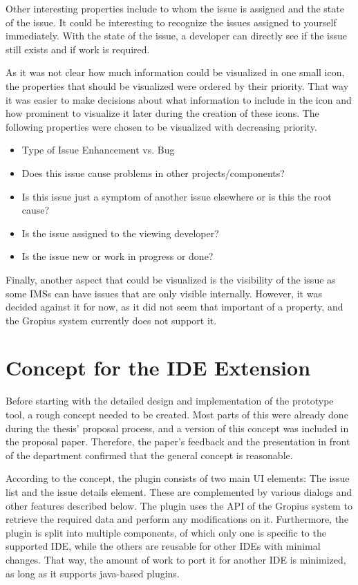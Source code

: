 Other interesting properties include to whom the issue is assigned and the state of the issue.
It could be interesting to recognize the issues assigned to yourself immediately.
With the state of the issue, a developer can directly see if the issue still exists and if work is required.

As it was not clear how much information could be visualized in one small icon, 
the properties that should be visualized were ordered by their priority.
That way it was easier to make decisions about what information to include in the icon and how prominent to visualize it later during the creation of these icons.
The following properties were chosen to be visualized with decreasing priority.
\begin{itemize}
	\item Type of Issue
	\subitem Enhancement vs. Bug
	\item Does this issue cause problems in other projects/components?
	\item Is this issue just a symptom of another issue elsewhere or is this the root cause?
	\item Is the issue assigned to the viewing developer?
	\item Is the issue new or work in progress or done?
\end{itemize}
Finally, another aspect that could be visualized is the visibility of the issue as some \glspl{IMS} can have issues that are only visible internally.
However, it was decided against it for now, as it did not seem that important of a property, and the Gropius system currently does not support it.

\section{Concept for the \gls{IDE} Extension}
\label{sec:ch3:s3}
Before starting with the detailed design and implementation of the prototype tool, a rough concept needed to be created.
Most parts of this were already done during the thesis' proposal process, and a version of this concept was included in the proposal paper.
Therefore, the paper's feedback and the presentation in front of the department confirmed that the general concept is reasonable.

According to the concept, the plugin consists of two main \gls{UI} elements: The issue list and the issue details element.
These are complemented by various dialogs and other features described below.
The plugin uses the \gls{API} of the \gls{Gropius} system to retrieve the required data and perform any modifications on it.
Furthermore, the plugin is split into multiple components, 
of which only one is specific to the supported \gls{IDE}, while the others are reusable for other \glspl{IDE} with minimal changes.
That way, the amount of work to port it for another \gls{IDE} is minimized,
as long as it supports \gls{java}-based plugins.
\shortpage

